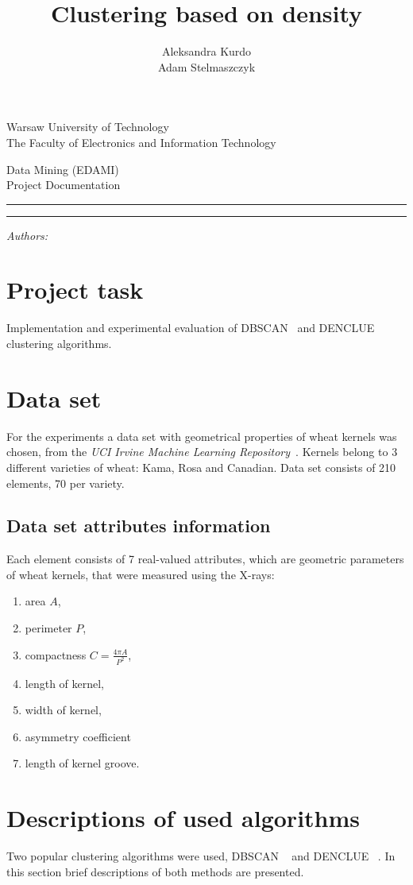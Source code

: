 \documentclass[12pt, a4paper, notitlepage, oneside]{article}
\title{Clustering based on density}
\author{Aleksandra Kurdo\\ Adam Stelmaszczyk}
\makeatletter
\newcommand{\linia}{\rule{\linewidth}{0.4mm}}
\renewcommand{\maketitle}{
\begin{titlepage}

    \vspace*{1cm}

    \begin{center}\small

    Warsaw University of Technology\\
    The Faculty of Electronics and Information Technology\\

    \end{center}

    \vspace{3cm}

     \begin{center}

    Data Mining (EDAMI)\\ Project Documentation

    \end{center}

    \noindent\linia

    \begin{center}

      \LARGE \textsc{\@title}

         \end{center}

     \noindent\linia

    \vspace{0.5cm}

    \begin{flushright}

    \begin{minipage}{5cm}

    \textit{\small Authors:}\\

    \normalsize \textsc{\@author} \par

    \end{minipage}

    \vspace{4cm} 
 
     \end{flushright}

    \vspace*{\stretch{6}}

    \begin{center}

    \@date

    \end{center}

  \end{titlepage}
}
\makeatother
\begin{document}
\maketitle
\tableofcontents

\newpage

\section{Project task}
Implementation and experimental evaluation of DBSCAN~\cite{dbscan} and DENCLUE~\cite{denclue} clustering algorithms. 

\section{Data set}

For the experiments a data set with geometrical properties of wheat kernels was chosen,
from the \textit{UCI Irvine Machine Learning Repository}~\cite{dataset}.
Kernels belong to 3 different varieties of wheat: Kama, Rosa and Canadian.
Data set consists of 210 elements, 70 per variety. 

\subsection{Data set attributes information}

Each element consists of 7 real-valued attributes, which are geometric parameters of wheat kernels, 
that were measured using the X-rays: 

\begin{enumerate}
	\item area $A$, 
	\item perimeter $P$, 
	\item compactness $C = \frac{4 \pi A}{P^2}$, 
	\item length of kernel, 
	\item width of kernel, 
	\item asymmetry coefficient 
	\item length of kernel groove. 
\end{enumerate}

\section{Descriptions of used algorithms}
 
Two popular clustering algorithms were used, DBSCAN ~\cite{dbscan} and DENCLUE ~\cite{denclue}. 
In this section brief descriptions of both methods are presented.
\end{document}
